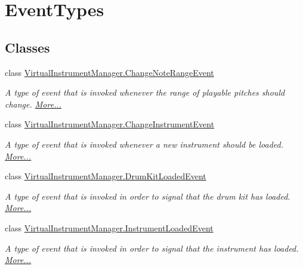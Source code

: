 \hypertarget{group___event_types}{}\section{Event\+Types}
\label{group___event_types}
\subsection*{Classes}
\begin{DoxyCompactItemize}
\item 
class \hyperlink{group___event_types_class_virtual_instrument_manager_1_1_change_note_range_event}{Virtual\+Instrument\+Manager.\+Change\+Note\+Range\+Event}
\begin{DoxyCompactList}\small\item\em A type of event that is invoked whenever the range of playable pitches should change.  \hyperlink{group___event_types_class_virtual_instrument_manager_1_1_change_note_range_event}{More...}\end{DoxyCompactList}\item 
class \hyperlink{group___event_types_class_virtual_instrument_manager_1_1_change_instrument_event}{Virtual\+Instrument\+Manager.\+Change\+Instrument\+Event}
\begin{DoxyCompactList}\small\item\em A type of event that is invoked whenever a new instrument should be loaded.  \hyperlink{group___event_types_class_virtual_instrument_manager_1_1_change_instrument_event}{More...}\end{DoxyCompactList}\item 
class \hyperlink{group___event_types_class_virtual_instrument_manager_1_1_drum_kit_loaded_event}{Virtual\+Instrument\+Manager.\+Drum\+Kit\+Loaded\+Event}
\begin{DoxyCompactList}\small\item\em A type of event that is invoked in order to signal that the drum kit has loaded.  \hyperlink{group___event_types_class_virtual_instrument_manager_1_1_drum_kit_loaded_event}{More...}\end{DoxyCompactList}\item 
class \hyperlink{group___event_types_class_virtual_instrument_manager_1_1_instrument_loaded_event}{Virtual\+Instrument\+Manager.\+Instrument\+Loaded\+Event}
\begin{DoxyCompactList}\small\item\em A type of event that is invoked in order to signal that the instrument has loaded.  \hyperlink{group___event_types_class_virtual_instrument_manager_1_1_instrument_loaded_event}{More...}\end{DoxyCompactList}\item 

\end{DoxyCompactItemize}
